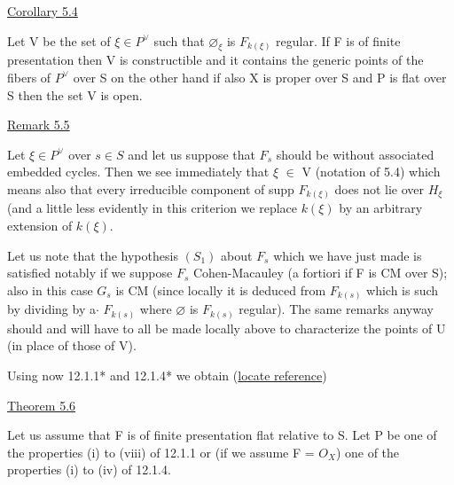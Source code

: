 
\uline{Corollary 5.4}

Let V be the set of $\xi \in P^{\vee}$ such that $\varnothing_{\xi}$ is $F_{k(\xi)}$ regular. If F
is of finite presentation then V is constructible and it contains
the generic points of the fibers of $P^{\vee}$ over S on the other hand if
also X is proper over S and P is flat over S then the set V is
open.

\uline{Remark 5.5}

Let $\xi \in P^{\vee}$ over $s \in S$ and let us suppose that $F_{s}$ should be
without associated embedded cycles. Then we see immediately that $\xi$
$\in$ V (notation of 5.4) which means also that every irreducible
component of supp $F_{k(\xi)}$ does not lie over $H_{\xi}$ (and a little less
evidently in this criterion we replace $k(\xi)$ by an arbitrary
extension of $k(\xi)$.

Let us note that the hypothesis $(S_{1})$ about $F_{s}$ which we have
just made is satisfied notably if we suppose $F_{s}$ Cohen-Macauley (a
fortiori if F is CM over S); also in this case $G_{s}$ is CM (since
locally it is deduced from $F_{k(s)}$ which is such by dividing by a\hand{$\Phi$}$\cdot$
$F_{k(s)}$ where $\varnothing$ is $F_{k(s)}$ regular). The same remarks anyway should and
will have to all be made locally above to characterize the points
of U (in place of those of V).

Using now 12.1.1* and 12.1.4* we obtain (\uline{locate reference})

\uline{Theorem 5.6}

Let us assume that F is of finite presentation flat relative
to S. Let P be one of the properties (i) to (viii) of 12.1.1 or
(if we assume F = $O_{X}$) one of the properties (i) to (iv) of 12.1.4.

